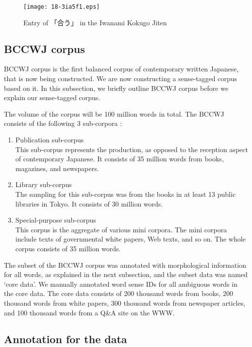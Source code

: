 \documentclass[english]{jnlp_1.4}
\begin{document}
\begin{figure}[b]
\begin{center}
\texttt{[image: 18-3ia5f1.eps]}
\end{center}
\caption{Entry of 「合う」 in the Iwanami Kokugo Jiten}
\end{figure}


\subsection{BCCWJ corpus}

BCCWJ corpus is the first balanced corpus of contemporary written
Japanese, that is now being constructed. We are now constructing a
sense-tagged corpus based on it. In this subsection, we briefly outline
BCCWJ corpus before we explain our sense-tagged corpus.

The volume of the corpus will be 100 million words in total. The BCCWJ
consists of the following 3 sub-corpora \cite{maekawa:08:a}:
\begin{enumerate}
\item Publication sub-corpus\\
This sub-corpus represents the production, as opposed to the reception
aspect of contemporary Japanese. It consists of 35 million words from
books, magazines, and newspapers.
\item Library sub-corpus\\
The sampling for this sub-corpus was from the books in at least 13
public libraries in Tokyo. It consists of 30 million words.
\item Special-purpose sub-corpus\\
This corpus is the aggregate of various mini corpora. The mini corpora
include texts of governmental white papers, Web texts, and so on. The
whole corpus consists of 35 million words.
\end{enumerate}

The subset of the BCCWJ corpus was annotated with morphological
information for all words, as explained in the next subsection, and
the subset data was named `core data'. We manually annotated word
sense IDs for all ambiguous words in the core data. The core data
consists of 200 thousand words from books, 200 thousand words from
white papers, 300 thousand words from newspaper articles, and 100
thousand words from a Q\&A site on the WWW.


\subsection{Annotation for the data}
\end{document}
